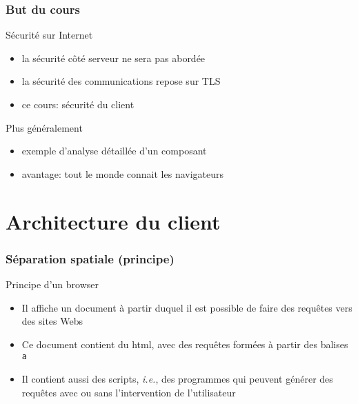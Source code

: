 

  
\usepackage{ifthen}


\def\txthl#1{ \ifthenelse{\lengthtest{#1 pt<0.5pt}}{\top}{\bot} }



\begin{reveals}
	
\def\pause{}
	
\maketitle


\begin{frame}
  \frametitle{But du cours}

  \vfill

  \begin{block}{Sécurité sur Internet}
    \begin{itemize}
    \item la sécurité côté serveur ne sera pas abordée
    \item la sécurité des communications repose sur TLS
    \item ce cours: sécurité du client
    \end{itemize}
  \end{block}
  \vfill

  \begin{block}{Plus généralement}
    \begin{itemize}
    \item exemple d'analyse détaillée d'un composant
    \item avantage: tout le monde connait les navigateurs
    \end{itemize}
  \end{block}
  \vfill
\end{frame}
\section{Architecture du client}

\begin{frame}
  \frametitle{S{\'e}paration spatiale (principe)}

  \begin{block}{Principe d'un browser}
    \begin{itemize}
    \item  Il affiche un document {\`a} partir duquel il est possible de
      faire des requ{\^e}tes vers des sites Webs
    \item Ce document contient du html, avec des requ{\^e}tes form{\'e}es {\`a} partir
      des balises \texttt{a}
    \item Il contient aussi des scripts, \textit{i.e.}, des programmes
      qui peuvent g{\'e}n{\'e}rer des requ{\^e}tes avec ou sans l'intervention de
      l'utilisateur
    \end{itemize}
  \end{block}



\end{frame}
\end{reveals}
